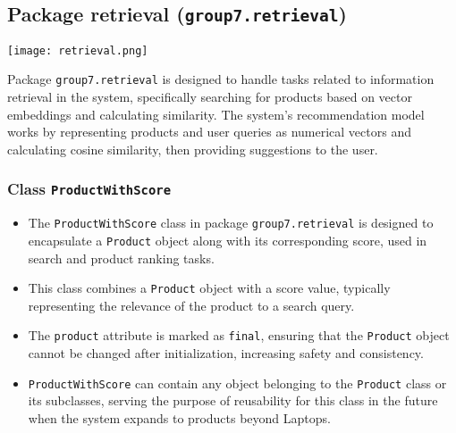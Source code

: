 \documentclass{article}
\begin{document}
\subsection{Package retrieval (\texttt{group7.retrieval})}

\texttt{[image: retrieval.png]}

Package \texttt{group7.retrieval} is designed to handle tasks related to information retrieval in the system, specifically searching for products based on vector embeddings and calculating similarity. The system's recommendation model works by representing products and user queries as numerical vectors and calculating cosine similarity, then providing suggestions to the user.

\subsubsection{Class \texttt{ProductWithScore}}
\begin{itemize}
    \item The \texttt{ProductWithScore} class in package \texttt{group7.retrieval} is designed to encapsulate a \texttt{Product} object along with its corresponding score, used in search and product ranking tasks.
    \item This class combines a \texttt{Product} object with a score value, typically representing the relevance of the product to a search query.
    \item The \texttt{product} attribute is marked as \texttt{final}, ensuring that the \texttt{Product} object cannot be changed after initialization, increasing safety and consistency.
    \item \texttt{ProductWithScore} can contain any object belonging to the \texttt{Product} class or its subclasses, serving the purpose of reusability for this class in the future when the system expands to products beyond Laptops.
\end{itemize}
\end{document}
